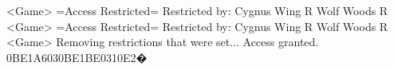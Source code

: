 <Game> =Access Restricted= 
Restricted by: Cygnus Wing R Wolf Woods R 
<Game> =Access Restricted= 
Restricted by: Cygnus Wing R Wolf Woods R 
<Game> Removing restrictions that were set... Access granted. 
{0B}{E1}{A6}{03}{0B}{E1}{BE}{03}{10}{E2}�
